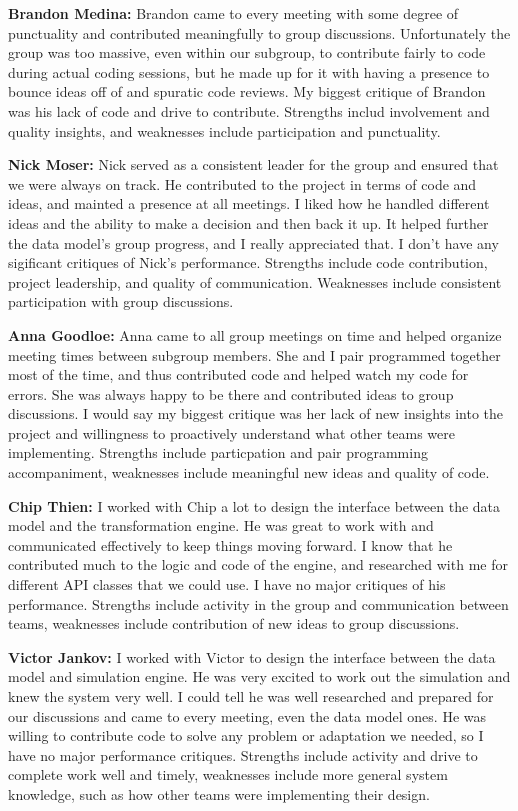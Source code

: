 \documentclass[11pt]{article}
\begin{document}
\begin{doublespace}
\textbf{Brandon Medina:} Brandon came to every meeting with some degree of punctuality and contributed meaningfully to group discussions. Unfortunately the group was too massive, even within our subgroup, to contribute fairly to code during actual coding sessions, but he made up for it with having a presence to bounce ideas off of and spuratic code reviews. My biggest critique of Brandon was his lack of code and drive to contribute. Strengths includ involvement and quality insights, and weaknesses include participation and punctuality. 

\textbf{Nick Moser:} Nick served as a consistent leader for the group and ensured that we were always on track. He contributed to the project in terms of code and ideas, and mainted a presence at all meetings. I liked how he handled different ideas and the ability to make a decision and then back it up. It helped further the data model's group progress, and I really appreciated that. I don't have any sigificant critiques of Nick's performance. Strengths include code contribution, project leadership, and quality of communication. Weaknesses include consistent participation with group discussions.

\textbf{Anna Goodloe:} Anna came to all group meetings on time and helped organize meeting times between subgroup members. She and I pair programmed together most of the time, and thus contributed code and helped watch my code for errors. She was always happy to be there and contributed ideas to group discussions. I would say my biggest critique was her lack of new insights into the project and willingness to proactively understand what other teams were implementing. Strengths include particpation and pair programming accompaniment, weaknesses include meaningful new ideas and quality of code.

\textbf{Chip Thien:} I worked with Chip a lot to design the interface between the data model and the transformation engine. He was great to work with and communicated effectively to keep things moving forward. I know that he contributed much to the logic and code of the engine, and researched with me for different API classes that we could use. I have no major critiques of his performance. Strengths include activity in the group and communication between teams, weaknesses include contribution of new ideas to group discussions.

\textbf{Victor Jankov:} I worked with Victor to design the interface between the data model and simulation engine. He was very excited to work out the simulation and knew the system very well. I could tell he was well researched and prepared for our discussions and came to every meeting, even the data model ones. He was willing to contribute code to solve any problem or adaptation we needed, so I have no major performance critiques. Strengths include activity and drive to complete work well and timely, weaknesses include more general system knowledge, such as how other teams were implementing their design.


\end{doublespace}
\end{document}

